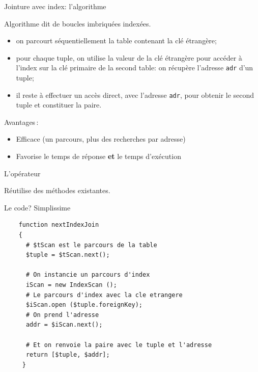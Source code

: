 \begin{frame}{Jointure avec index: l'algorithme}

Algorithme dit de \alert{boucles imbriquées indexées}.

\begin{itemize}

  \item on parcourt séquentiellement la table contenant la clé étrangère;
 
   \item pour chaque tuple, on utilise la valeur de la clé étrangère pour
   accéder à l'index sur la clé primaire
   de la second table: on récupère l'adresse \texttt{adr} d'un tuple;
 \item il reste à effectuer un accès direct, avec l'adresse \texttt{adr}, pour
   obtenir le second tuple et constituer la paire. 

\end{itemize}

\vfill

Avantages\,:
  \begin{itemize}
      \item  Efficace (un parcours, plus des recherches par adresse)

      \item Favorise le temps de réponse \textbf{et} le temps
                 d'exécution
\end{itemize}

\end{frame}

\begin{frame}{L'opérateur}

Réutilise des méthodes existantes.

\vfill


\end{frame}

\begin{frame}[fragile]{Le code? Simplissime}
\begin{verbatim}
    function nextIndexJoin
    {
      # $tScan est le parcours de la table      
      $tuple = $tScan.next();

      # On instancie un parcours d'index
      iScan = new IndexScan ();
      # Le parcours d'index avec la cle etrangere
      $iScan.open ($tuple.foreignKey);
      # On prend l'adresse 
      addr = $iScan.next();
 
      # Et on renvoie la paire avec le tuple et l'adresse      
      return [$tuple, $addr];
     }
\end{verbatim}

\end{frame}

